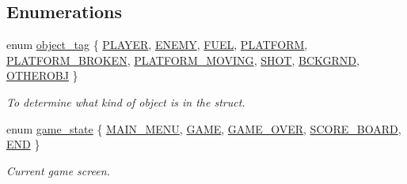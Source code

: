 \subsection*{Enumerations}
\begin{DoxyCompactItemize}
\item 
enum \hyperlink{group__utils_ga3eff9ebd9f241e211e00b991e2ac60fc}{object\+\_\+tag} \{ \newline
\hyperlink{group__utils_gga3eff9ebd9f241e211e00b991e2ac60fcade5dc3e0dbd007d995ed3e37bde5ce7e}{P\+L\+A\+Y\+ER}, 
\hyperlink{group__utils_gga3eff9ebd9f241e211e00b991e2ac60fca5ce368bdfc444a87fef6c208b4101571}{E\+N\+E\+MY}, 
\hyperlink{group__utils_gga3eff9ebd9f241e211e00b991e2ac60fca8bda58832a68157abbcdcbb92f2e797c}{F\+U\+EL}, 
\hyperlink{group__utils_gga3eff9ebd9f241e211e00b991e2ac60fca2c2ba2ae05d0e6c35b68d51aadbe5a25}{P\+L\+A\+T\+F\+O\+RM}, 
\newline
\hyperlink{group__utils_gga3eff9ebd9f241e211e00b991e2ac60fcada3ded2e79d0642e248de91bc64d8c04}{P\+L\+A\+T\+F\+O\+R\+M\+\_\+\+B\+R\+O\+K\+EN}, 
\hyperlink{group__utils_gga3eff9ebd9f241e211e00b991e2ac60fca595f17785fbf7e4f7febb638e4a680d9}{P\+L\+A\+T\+F\+O\+R\+M\+\_\+\+M\+O\+V\+I\+NG}, 
\hyperlink{group__utils_gga3eff9ebd9f241e211e00b991e2ac60fcabd11813ad5c217a8d8d07c1d6cb01b1e}{S\+H\+OT}, 
\hyperlink{group__utils_gga3eff9ebd9f241e211e00b991e2ac60fca4f23dbcf261e79c755c4f99cf1850c0c}{B\+C\+K\+G\+R\+ND}, 
\newline
\hyperlink{group__utils_gga3eff9ebd9f241e211e00b991e2ac60fcae79489c2ae437e5e07da3ec10e5062a9}{O\+T\+H\+E\+R\+O\+BJ}
 \}\begin{DoxyCompactList}\small\item\em To determine what kind of object is in the struct. \end{DoxyCompactList}
\item 
enum \hyperlink{group__utils_gad0ed1832dd134806ad335cdcc1a59ad2}{game\+\_\+state} \{ \newline
\hyperlink{group__utils_ggad0ed1832dd134806ad335cdcc1a59ad2ac22743f1fc74de09544ecc9bab74a17b}{M\+A\+I\+N\+\_\+\+M\+E\+NU}, 
\hyperlink{group__utils_ggad0ed1832dd134806ad335cdcc1a59ad2ad50cf309d7568040619ed26ee6835a84}{G\+A\+ME}, 
\hyperlink{group__utils_ggad0ed1832dd134806ad335cdcc1a59ad2a871723195985a4ae22d7e10d99bf8a00}{G\+A\+M\+E\+\_\+\+O\+V\+ER}, 
\hyperlink{group__utils_ggad0ed1832dd134806ad335cdcc1a59ad2aa0567990ca6272278d71effe9bd3f7c8}{S\+C\+O\+R\+E\+\_\+\+B\+O\+A\+RD}, 
\newline
\hyperlink{group__utils_ggad0ed1832dd134806ad335cdcc1a59ad2adc6f24fd6915a3f2786a1b7045406924}{E\+ND}
 \}\begin{DoxyCompactList}\small\item\em Current game screen. \end{DoxyCompactList}
\end{DoxyCompactItemize}
